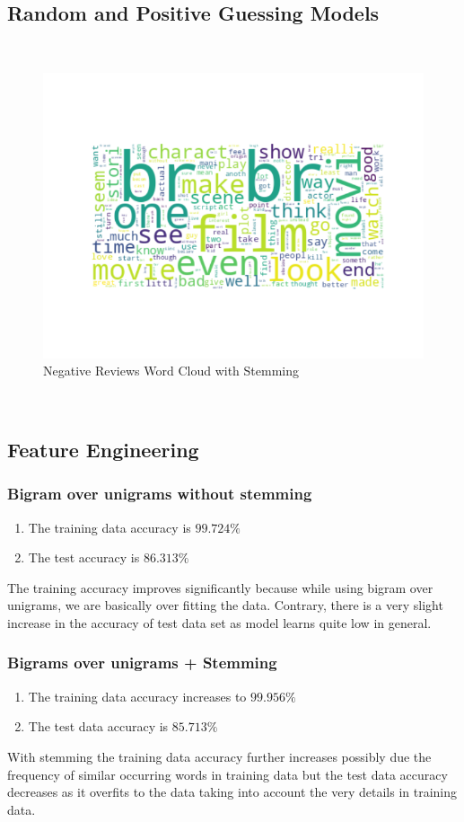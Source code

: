 \documentclass[11pt]{article}
\begin{document}
\subsection{Random and Positive Guessing Models}
\\
\begin{figure}[H]
  \includegraphics[width=\linewidth]{StemmedNegativeWordCloud.png}
  \caption{Negative Reviews Word Cloud with Stemming}
  \label{fig1B}
\end{figure}
\\

\subsection{Feature Engineering}

\subsubsection{Bigram over unigrams without stemming}
\begin{enumerate}
  \item The training data accuracy is $99.724\%$
  \item The test accuracy is $86.313\%$
\end{enumerate}
The training accuracy improves significantly because while using bigram over unigrams, we are basically over fitting the data. Contrary, there is a very slight increase in the accuracy of test data set as model learns quite low in general.

\subsubsection{Bigrams over unigrams + Stemming}
\begin{enumerate}
  \item The training data accuracy increases to $99.956\%$
  \item The test data accuracy is $85.713\%$
\end{enumerate}
With stemming the training data accuracy further increases possibly due the frequency of similar occurring words in training data but the test data accuracy decreases as it overfits to the data taking into account the very details in training data.
\end{document}
